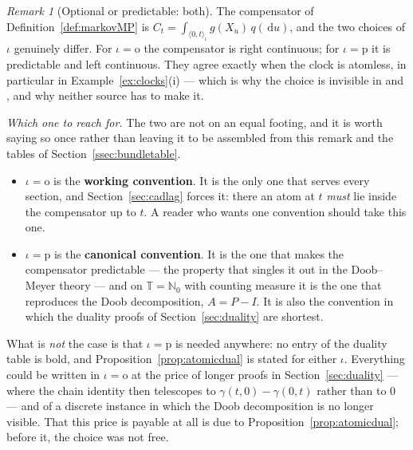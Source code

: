 \documentclass[11pt,a4paper]{article}
\theoremstyle{plain}
\theoremstyle{definition}
\theoremstyle{remark}
\newtheorem{remark}[theorem]{Remark}
\newcommand{\N}{\mathbb{N}}
\newcommand{\T}{\mathbb{T}}                     %
\newcommand{\dif}{\,\mathrm{d}}
\newcommand{\EK}{\cite{EK86}}
\newcommand{\CPS}{\cite{CPS23}}
\begin{document}
\begin{remark}[Optional or predictable: both]
  \label{rem:convention}
  The compensator of Definition~\ref{def:markovMP} is
  $C_t = \int_{\langle 0,t\rangle_\iota} g(X_u)\,q(\dif u)$, and the two choices of
  $\iota$ genuinely differ.  For $\iota = \mathrm{o}$ the compensator is right
  continuous; for $\iota = \mathrm{p}$ it is predictable and left continuous.
  They agree exactly when the clock is atomless, in particular in
  Example~\ref{ex:clocks}(i) --- which is why the choice is invisible in \EK{}
  and \CPS{}, and why neither source has to make it.

  \emph{Which one to reach for.}  The two are not on an equal footing, and it is
  worth saying so once rather than leaving it to be assembled from this remark
  and the tables of Section~\ref{ssec:bundletable}.

  \begin{itemize}
  \item $\iota = \mathrm{o}$ is the \textbf{working convention}.  It is the only
    one that serves every section, and Section~\ref{sec:cadlag} forces it: there
    an atom at $t$ \emph{must} lie inside the compensator up to $t$.  A reader
    who wants one convention should take this one.
  \item $\iota = \mathrm{p}$ is the \textbf{canonical convention}.  It is the one
    that makes the compensator predictable --- the property that singles it out
    in the Doob--Meyer theory --- and on $\T = \N_0$ with counting measure it is
    the one that reproduces the Doob decomposition, $A = P - I$.  It is also the
    convention in which the duality proofs of Section~\ref{sec:duality} are
    shortest.
  \end{itemize}

  What is \emph{not} the case is that $\iota = \mathrm{p}$ is needed anywhere: no
  entry of the duality table is bold, and
  Proposition~\ref{prop:atomicdual} is stated for either $\iota$.  Everything
  could be written in $\iota = \mathrm{o}$ at the price of longer proofs in
  Section~\ref{sec:duality} --- where the chain identity then telescopes to
  $\gamma(t,0) - \gamma(0,t)$ rather than to $0$ --- and of a discrete instance in
  which the Doob decomposition is no longer visible.  That this price is payable
  at all is due to Proposition~\ref{prop:atomicdual}; before it, the choice was
  not free.


\end{remark}
\end{document}
